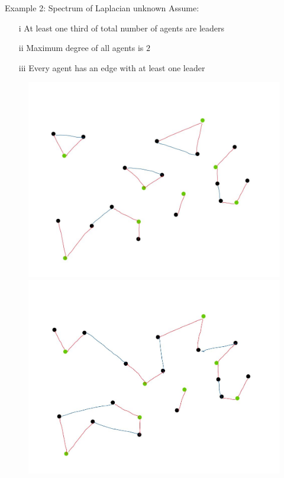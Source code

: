 \documentclass{beamer}
\begin{document}
\begin{frame}{Example 2: Spectrum of Laplacian unknown}
	Assume:
	\begin{itemize}
		\item[i] At least one third of total number of agents are leaders
		\item[ii] Maximum degree of all agents is $2$				
		\item[iii] Every agent has an edge with at least one leader
	\end{itemize}
\begin{figure}[!htb]
	\centering
	\begin{minipage}{.5\textwidth}
		\centering
		\includegraphics[scale=0.32]{figures/graph_example_2.jpg} \\
		\centering
		\includegraphics[scale=0.32]{figures/graph_example_3.jpg}

\end{minipage}
\end{figure}
\end{frame}
\end{document}
